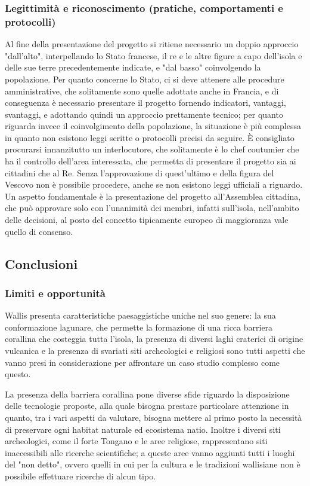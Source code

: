 \documentclass[fleqn,11pt]{SelfArx} %
\begin{document}
\subsubsection{Legittimità e riconoscimento (pratiche, comportamenti e protocolli)}
Al fine della presentazione del progetto si ritiene necessario un doppio approccio "dall'alto", interpellando lo Stato francese, il re e le altre figure a capo dell'isola e delle sue terre  precedentemente indicate, e "dal basso" coinvolgendo la popolazione.
Per quanto concerne lo Stato, ci si deve attenere alle procedure amministrative, che solitamente sono quelle adottate anche in Francia, e di conseguenza è necessario presentare il progetto fornendo indicatori, vantaggi, svantaggi, e adottando quindi un approccio prettamente tecnico; per quanto riguarda invece il coinvolgimento della popolazione, la situazione è più complessa in quanto non esistono leggi scritte o protocolli precisi da seguire. 
È consigliato procurarsi innanzitutto un interlocutore, che solitamente è lo chef coutumier che ha il controllo dell'area interessata, che permetta di presentare il progetto sia ai cittadini che al Re. 
Senza l'approvazione di quest'ultimo e della figura del Vescovo non è possibile procedere, anche se non esistono leggi ufficiali a riguardo. 
Un aspetto fondamentale è la presentazione del progetto all'Assemblea cittadina, che può approvare solo con l'unanimità dei membri, infatti sull'isola, nell'ambito delle decisioni, al posto del concetto tipicamente europeo di maggioranza vale quello di consenso.


\subsection{Conclusioni}
\subsubsection{Limiti e opportunità}
Wallis presenta caratteristiche paesaggistiche uniche nel suo genere: la sua conformazione lagunare, che permette la formazione di una ricca barriera corallina che costeggia tutta l'isola, la presenza di diversi laghi craterici di origine vulcanica e la presenza di svariati siti archeologici e religiosi sono tutti aspetti che vanno presi in considerazione per affrontare un caso studio complesso come questo. 

La presenza della barriera corallina pone diverse sfide riguardo la disposizione delle tecnologie proposte, alla quale bisogna prestare particolare attenzione in quanto, tra i vari aspetti da valutare, bisogna mettere al primo posto la necessità di preservare ogni habitat naturale ed ecosistema natio. Inoltre i diversi siti archeologici, come il forte Tongano e le aree religiose, rappresentano siti inaccessibili alle ricerche scientifiche; a queste aree vanno aggiunti tutti i luoghi del "non detto", ovvero quelli in cui per la cultura e le tradizioni wallisiane non è possibile effettuare ricerche di alcun tipo. 
\end{document}
